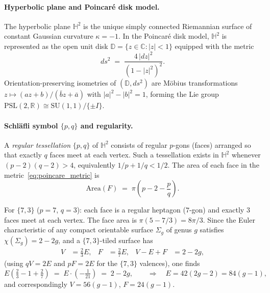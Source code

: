 \documentclass[11pt,oneside]{amsbook}
\numberwithin{equation}{section}
\theoremstyle{plain}
\theoremstyle{definition}
\theoremstyle{remark}
\begin{document}
\paragraph{Hyperbolic plane and Poincar\'e disk model.}
The hyperbolic plane $\mathbb{H}^2$ is the unique simply connected
Riemannian surface of constant Gaussian curvature $\kappa = -1$.  In the
Poincar\'e disk model, $\mathbb{H}^2$ is represented as the open unit disk
$\mathbb{D} = \{z\in\mathbb{C} : |z|<1\}$ equipped with the metric
\begin{equation}
  ds^2 \;=\; \frac{4\,|dz|^2}{(1-|z|^2)^2}.
\label{eq:poincare_metric}
\end{equation}
Orientation-preserving isometries of $(\mathbb{D},ds^2)$ are M\"obius
transformations $z\mapsto (az+b)/(\bar b z+\bar a)$ with $|a|^2-|b|^2=1$,
forming the Lie group $\mathrm{PSL}(2,\mathbb{R}) \cong \mathrm{SU}(1,1)/\{\pm I\}$.

\paragraph{Schl\"afli symbol $\{p,q\}$ and regularity.}
A \emph{regular tessellation} $\{p,q\}$ of $\mathbb{H}^2$ consists of
regular $p$-gons (faces) arranged so that exactly $q$ faces meet at each
vertex.  Such a tessellation exists in $\mathbb{H}^2$ whenever
$(p-2)(q-2) > 4$, equivalently $1/p + 1/q < 1/2$.  The area of each face in
the metric~\eqref{eq:poincare_metric} is
\[
  \mathrm{Area}(F) \;=\; \pi\!\left(p-2 - \frac{p}{q}\right).
\]

For $\{7,3\}$ ($p=7$, $q=3$): each face is a regular heptagon
($7$-gon) and exactly $3$ faces meet at each vertex.  The face area is
$\pi(5-7/3) = 8\pi/3$.  Since the Euler characteristic of any compact
orientable surface $\Sigma_g$ of genus $g$ satisfies $\chi(\Sigma_g) = 2-2g$,
and a $\{7,3\}$-tiled surface has
\begin{align}
  V &= \tfrac{2}{3}E, & F &= \tfrac{2}{7}E, & V-E+F &= 2-2g,
\label{eq:euler_73}
\end{align}
(using $qV = 2E$ and $pF = 2E$ for the $\{7,3\}$ valences), one finds
\begin{equation}
  E\!\left(\tfrac{2}{3}-1+\tfrac{2}{7}\right)
  \;=\; E\cdot\!\left(-\tfrac{1}{21}\right)
  \;=\; 2-2g,
  \qquad\Longrightarrow\quad
  E = 42(2g-2) = 84(g-1),
\label{eq:E_formula}
\end{equation}
and correspondingly $V = 56(g-1)$, $F = 24(g-1)$.
\end{document}

